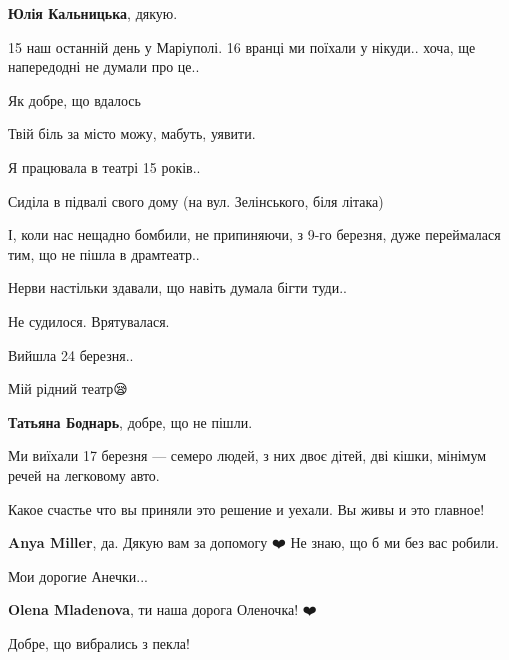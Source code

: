 \begin{itemize} %
\textbf{Юлія Кальницька}, дякую.
\end{itemize} %


15 наш останній день у Маріуполі. 16 вранці ми поїхали у нікуди.. хоча, ще напередодні не думали про це..


Як добре, що вдалось🙏

Твій біль за місто можу, мабуть, уявити.


Я працювала в театрі 15 років..

Сиділа в підвалі свого дому (на вул. Зелінського, біля літака)

І, коли нас нещадно бомбили, не припиняючи, з 9-го березня, дуже переймалася тим, що не пішла в драмтеатр..

Нерви настільки здавали, що навіть думала бігти туди..

Не судилося. Врятувалася.

Вийшла 24 березня..

Мій рідний театр😪

\begin{itemize} %
\textbf{Татьяна Боднарь}, добре, що не пішли.
\end{itemize} %


Ми виїхали 17 березня — семеро людей, з них двоє дітей, дві кішки, мінімум речей на легковому авто.


Какое счастье что вы приняли это решение и уехали. Вы живы и это главное!

\begin{itemize} %
\textbf{Anya Miller}, да. Дякую вам за допомогу ❤️ Не знаю, що б ми без вас робили.


Мои дорогие Анечки...

\textbf{Olena Mladenova}, ти наша дорога Оленочка! ❤️
\end{itemize} %


Добре, що вибрались з пекла!
